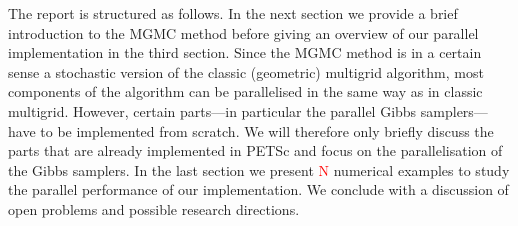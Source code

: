 \documentclass[
fontsize=11pt,
paper=a4,
numbers=noenddot
]{scrartcl}
\begin{document}

The report is structured as follows. In the next section we provide a brief introduction to the MGMC method before giving an overview of our parallel implementation in the third section. Since the MGMC method is in a certain sense a stochastic version of the classic (geometric) multigrid algorithm, most components of the algorithm can be parallelised in the same way as in classic multigrid.
However, certain parts---in particular the parallel Gibbs samplers---have to be implemented from scratch. We will therefore only briefly discuss the parts that are already implemented in PETSc and focus on the  parallelisation of the Gibbs samplers. In the last section we present \textcolor{red}{N} numerical examples to study the parallel performance of our implementation. We conclude with a discussion of open problems and possible research directions.
\end{document}
